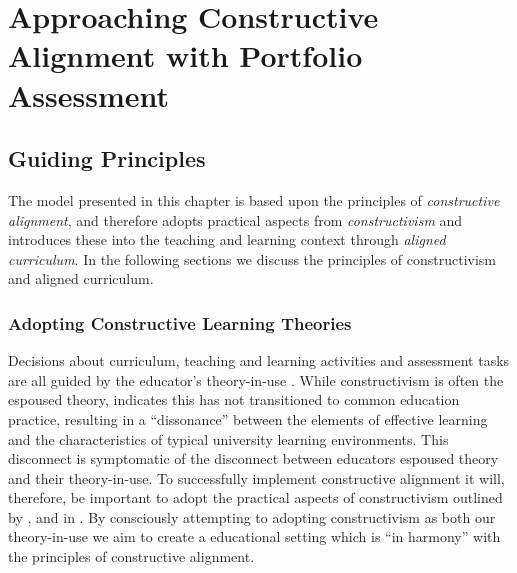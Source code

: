 
\chapter{Approaching Constructive Alignment with Portfolio Assessment} %
\label{cha:approach}

\graphicspath{{Figures/CAApproach/}}

\section{Guiding Principles} %
\label{sec:guiding_principles}

The model presented in this chapter is based upon the principles of \emph{constructive alignment}, and therefore adopts practical aspects from \emph{constructivism} and introduces these into the teaching and learning context through \emph{aligned curriculum}. In the following sections we discuss the principles of constructivism and aligned curriculum.

\subsection{Adopting Constructive Learning Theories } %
\label{sub:ideas_adopted_from_constructivism}

Decisions about curriculum, teaching and learning activities and assessment tasks are all guided by the educator's theory-in-use \cite{Argyris:1976}. While constructivism is often the espoused theory, \citet{Phillips:2005} indicates this has not transitioned to common education practice, resulting in a ``dissonance'' between the elements of effective learning and the characteristics of typical university learning environments. This disconnect is symptomatic of the disconnect between educators espoused theory and their theory-in-use. To successfully implement constructive alignment it will, therefore, be important to adopt the practical aspects of constructivism outlined by \citet{Biggs:1996c}, \citet{Biggs:1997} and in \citet{Biggs:2007}. By consciously attempting to adopting constructivism as both our theory-in-use we aim to create a educational setting which is ``in harmony'' with the principles of constructive alignment.

